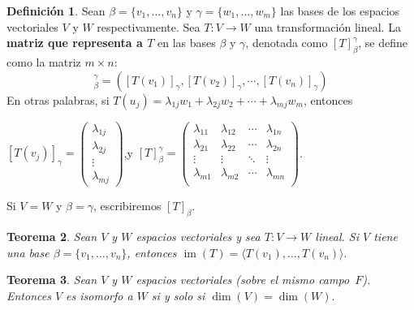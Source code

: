 \documentclass[12pt]{book}
\newtheorem{theorem}{Teorema}[section]
\theoremstyle{definition}
\newtheorem{definition}[theorem]{Definición}
\DeclareMathOperator{\im}{im}
\newcounter{in}
\newcounter{ini}
\begin{document}
\begin{definition}
  \label{matr-rep-T}
  Sean $\beta=\{v_{1},\ldots,v_{n}\}$ y
  $\gamma=\{w_{1},\ldots,w_{m}\}$ las bases de los espacios
  vectoriales $V$ y $W$ respectivamente. Sea $T:V\rightarrow W$ una
  transformación lineal. La \textbf{matriz que representa a $T$}
  en las bases $\beta$ y $\gamma$, denotada como
  $[T]^{\gamma}_{\beta}$, se define como la matriz $m\times n$:
  \begin{equation*}
    [T]^{\gamma}_{\beta}=([T(v_{1})]_{\gamma},[T(v_{2})]_{\gamma},\cdots,[T(v_{n})]_{\gamma})
  \end{equation*}
  En otras palabras, si
  $T(u_{j})=\lambda_{1j}w_{1}+\lambda_{2j}w_{2}+\cdots+\lambda_{mj}w_{m}$,
  entonces
\begin{center}
    $[T(v_{j})]_{\gamma}=\begin{pmatrix}
      \lambda_{1j}\\
      \lambda_{2j}\\
      \vdots\\
      \lambda_{mj}
    \end{pmatrix}$,\quad y \quad $[T]^{\gamma}_{\beta}=\begin{pmatrix}
      \lambda_{11} & \lambda_{12} & \cdots & \lambda_{1n} \\
      \lambda_{21} & \lambda_{22} & \cdots & \lambda_{2n} \\
      \vdots & \vdots & \ddots & \vdots \\ 
      \lambda_{m1} & \lambda_{m2} & \cdots & \lambda_{mn} \\
    \end{pmatrix}$.
  \end{center}
Si $V=W$ y $\beta=\gamma$, escribiremos $[T]_{\beta}$.
\end{definition}

\begin{theorem}
  \label{imT}
  Sean $V$ y $W$ espacios vectoriales y sea $T:V \rightarrow W$
  lineal. Si $V$ tiene una base $\beta=\{v_{1},\ldots,v_{n}\}$,
  entonces $\im(T)=\langle T(v_{1}),\ldots,T(v_{n})\rangle.$  
\end{theorem}

\begin{theorem}
  \label{esp-isomorfos}
  Sean $V$ y $W$ espacios vectoriales (sobre el mismo
  campo~$F$). Entonces $V$ es isomorfo a $W$ si y solo si $\dim
  (V)=\dim(W).$ 
\end{theorem}
\end{document}
